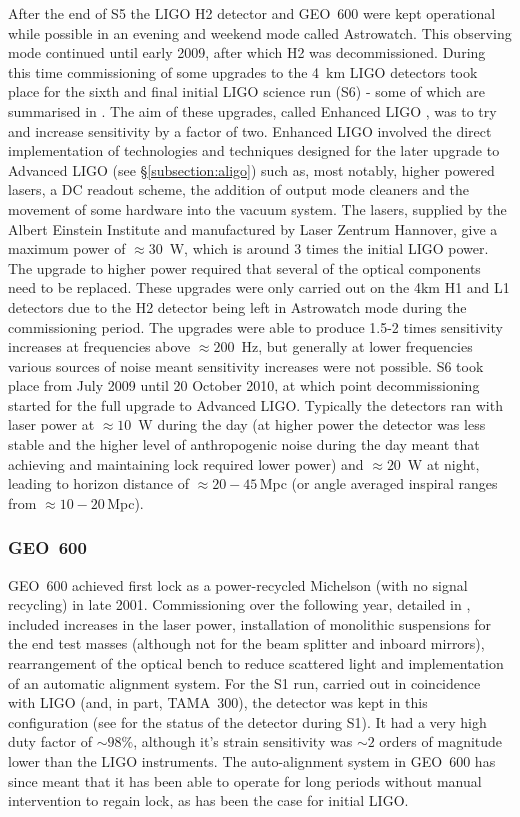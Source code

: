 \documentclass{article}
\begin{document}
After the end of S5 the LIGO H2 detector and GEO~600 were kept operational
while possible in an evening and weekend mode called Astrowatch. This
observing mode continued until early 2009, after which H2 was decommissioned.
During this time commissioning of some upgrades to the 4~km LIGO detectors took
place for the sixth and final initial LIGO science run (S6) - some of which are
summarised in \cite{Whitcomb:2008}. The aim of these upgrades, called Enhanced 
LIGO \cite{EnhancedLIGO}, was to try and  increase sensitivity by a factor of two. 
Enhanced LIGO involved the direct implementation of technologies and techniques 
designed for the later upgrade to Advanced LIGO (see \S\ref{subsection:aligo}) 
such as, most notably, higher powered lasers, a DC readout
scheme, the addition of output mode cleaners and the movement of some hardware
into the vacuum system. The lasers, supplied by the Albert Einstein Institute
and manufactured by Laser Zentrum Hannover, give a maximum power of $\approx30$~W, 
which is around 3 times the initial LIGO power. The upgrade to higher power required that
several of the optical components need to be replaced. These upgrades were only
carried out on the 4km H1 and L1 detectors due to the H2 detector being
left in Astrowatch mode during the commissioning period. The upgrades were able 
to produce 1.5-2 times sensitivity increases at frequencies above $\approx 200$~Hz, 
but generally at lower frequencies various sources of noise meant sensitivity 
increases were not possible. S6 took place from July 2009 until 20 October 
2010, at which point decommissioning started for the full upgrade to Advanced LIGO. 
Typically the detectors ran with laser power at $\approx10$~W during the day (at
higher power the detector was less stable and the higher level of anthropogenic 
noise during the day meant that achieving and maintaining lock required lower
power) and $\approx 20$~W at night, leading to horizon distance of $\approx20-45$\,Mpc 
(or angle averaged inspiral ranges from $\approx 10-20$\,Mpc).

\subsubsection{GEO~600}
GEO~600 achieved first lock as a power-recycled Michelson (with no signal
recycling) in late 2001. Commissioning over the following year, detailed in
\cite{Hewitson:2003}, included increases in the laser power, installation of
monolithic suspensions for the end test masses (although not for the beam
splitter and inboard mirrors), rearrangement of the optical bench to reduce
scattered light and implementation of an automatic alignment system. For the S1
run, carried out in coincidence with LIGO (and, in part, TAMA~300), the detector
was kept in this configuration (see \cite{Abbott:2004a} for the status of the
detector during S1). It had a very high duty factor of $\sim98\%$, although
it's strain sensitivity was $\sim2$ orders of magnitude lower than the LIGO
instruments. The auto-alignment system in GEO~600 has since meant that it has
been able to operate for long periods without manual intervention to regain
lock, as has been the case for initial LIGO.
\end{document}
